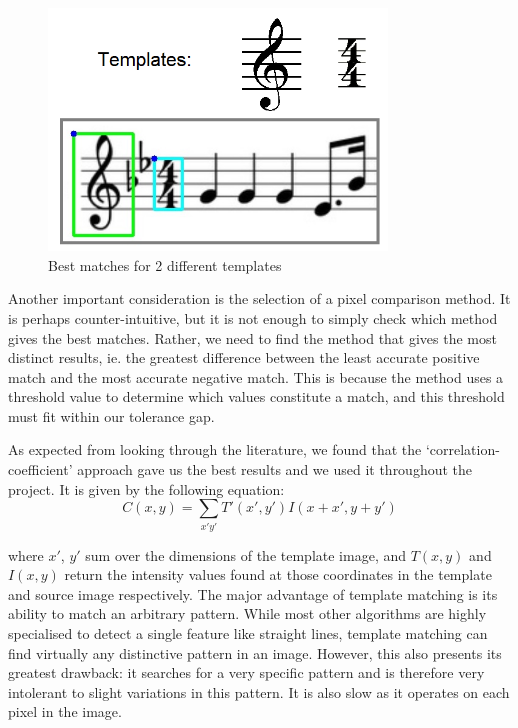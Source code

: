             \begin{figure}[h!]
                \centering
                \includegraphics[width=90mm]{./assets/templatematch.png}
                \caption{Best matches for 2 different templates}
                \label{image:templatematch}
            \end{figure}

Another important consideration is the selection of a pixel comparison method. It is perhaps counter-intuitive, but it is not enough to simply check which method gives the best matches. Rather, we need to find the method that gives the most distinct results, ie. the greatest difference between the least accurate positive match and the most accurate negative match. This is because the method uses a threshold value to determine
which values constitute a match, and this threshold must fit within our tolerance gap.

As expected from looking through the literature, we found that the ‘correlation-coefficient’ approach gave us the best results and we used it throughout the project.  
It is given by the following equation:
\begin{equation}
	C(x,y) = \sum_{x'y'} T'(x',y') I(x+x',y+y')
\end{equation}

where $x'$, $y'$ sum over the dimensions of the template image, and $T(x,y)$ and $I(x,y)$ return the intensity values found at those coordinates in the template and source image respectively.
The major advantage of template matching is its ability to match an arbitrary pattern. While most other algorithms are highly specialised to detect a single feature like straight lines, template matching can find virtually any distinctive pattern in an image. However, this also presents its greatest drawback: it searches for a very specific pattern and is therefore very intolerant to slight variations in this pattern. It
is also slow as it operates on each pixel in the image.


